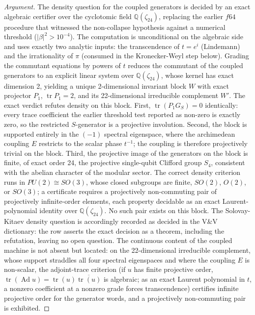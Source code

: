 \begin{proof}[Argument]
The density question for the coupled generators is decided by an exact algebraic certifier over the cyclotomic field $\mathbb{Q}(\zeta_{24})$, replacing the earlier $f64$ procedure that witnessed the non-collapse hypothesis against a numerical threshold ($|\beta|^2 > 10^{-4}$).
The computation is unconditional on the algebraic side and uses exactly two analytic inputs: the transcendence of $t = e^{i}$ (Lindemann) and the irrationality of $\pi$ (consumed in the Kronecker-Weyl step below). Grading the commutant equations by powers of $t$ reduces the commutant of the coupled generators to an explicit linear system over $\mathbb{Q}(\zeta_{24})$, whose kernel has exact dimension 2, yielding a unique 2-dimensional invariant block $W$ with exact projector $P_1$, $\operatorname{tr} P_1 = 2$, and its 22-dimensional irreducible complement $W'$.
The exact verdict refutes density on this block.
First, $\operatorname{tr}(P_1 G_S) = 0$ identically: every trace coefficient the earlier threshold test reported as non-zero is exactly zero, so the restricted $S$-generator is a projective involution.
Second, the block is supported entirely in the $(-1)$ spectral eigenspace, where the archimedean coupling $E$ restricts to the scalar phase $t^{-1}$; the coupling is therefore projectively trivial on the block.
Third, the projective image of the generators on the block is finite, of exact order 24, the projective single-qubit Clifford group $S_4$, consistent with the abelian character of the modular sector.
The correct density criterion runs in $PU(2) \cong SO(3)$, whose closed subgroups are finite, $SO(2)$, $O(2)$, or $SO(3)$; a certificate requires a projectively non-commuting pair of projectively infinite-order elements, each property decidable as an exact Laurent-polynomial identity over $\mathbb{Q}(\zeta_{24})$.
No such pair exists on this block.
The Solovay-Kitaev density question is accordingly recorded as decided in the V\&V dictionary: the row asserts the exact decision as a theorem, including the refutation, leaving no open question.
The continuous content of the coupled machine is not absent but located: on the 22-dimensional irreducible complement, whose support straddles all four spectral eigenspaces and where the coupling $E$ is non-scalar, the adjoint-trace criterion (if $u$ has finite projective order, $\operatorname{tr}(\operatorname{Ad} u) = \operatorname{tr}(u)\overline{\operatorname{tr}(u)}$ is algebraic; as an exact Laurent polynomial in $t$, a nonzero coefficient at a nonzero grade forces transcendence) certifies infinite projective order for the generator words, and a projectively non-commuting pair is exhibited.

\end{proof}
